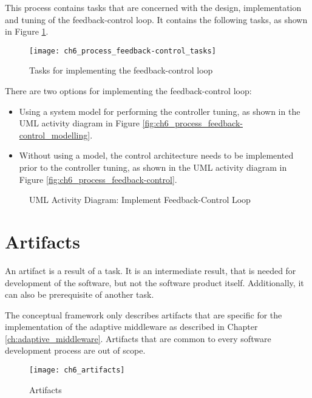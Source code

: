 This process contains tasks that are concerned with the design, implementation and tuning of the feedback-control loop. It contains the following tasks, as shown in Figure \ref{fig:ch6_tasks_feedback_control}.

\begin{figure}[htpb] \centering 
	\texttt{[image: ch6\_process\_feedback-control\_tasks]} 
	\caption{Tasks for implementing the feedback-control loop} 
	\label{fig:ch6_tasks_feedback_control} 
\end{figure}

There are two options for implementing the feedback-control loop:
\begin{itemize}
	\item Using a system model for performing the controller tuning, as shown in the \ac{UML} activity diagram in Figure \ref{fig:ch6_process_feedback-control_modelling}.
	\item Without using a model, the control architecture needs to be implemented prior to the controller tuning, as shown in the \ac{UML} activity diagram in Figure \ref{fig:ch6_process_feedback-control}.
\end{itemize}

\begin{figure}[htpb] \centering 
	\qquad
	\caption{\ac{UML} Activity Diagram: Implement Feedback-Control Loop} 
\end{figure}

\section{Artifacts}\label{sec:ch6_artifacts}

An artifact is a result of a task. It is an intermediate result, that is needed for development of the software, but not the software product itself. Additionally, it can also be prerequisite of another task. 

The conceptual framework only describes artifacts that are specific for the implementation of the adaptive middleware as described in Chapter \ref{ch:adaptive_middleware}. Artifacts that are common to every software development process are out of scope.

\begin{figure}[htpb] \centering 
	\texttt{[image: ch6\_artifacts]} 
	\caption{Artifacts} 
	\label{fig:ch6_artifacts} 
\end{figure}

